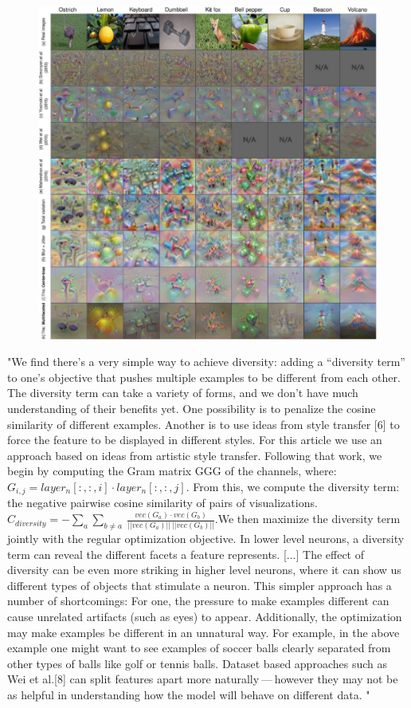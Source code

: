 \documentclass[]{scrartcl}
\begin{document}
\begin{figure}[h]
	\centering
	\includegraphics[width=1\linewidth]{multifaceted}
\end{figure}
"We ﬁnd there’s a very simple way to achieve diversity: adding a “diversity term” to one’s objective that pushes multiple examples to be different from each other. The diversity term can take a variety of forms, and we don’t have much understanding of their beneﬁts yet. One possibility is to penalize the cosine similarity of different examples. Another is to use ideas from style transfer [6] to force the feature to be displayed in different styles. For this article we use an approach based on ideas from artistic style transfer. Following that work, we begin by computing the Gram matrix GGG of the channels, where: $G_{i,j} = layer_n[:, :, i] \cdot layer_n[:, :, j]$. From this, we compute the diversity term: the negative pairwise cosine similarity of pairs of visualizations. $C_{diversity} = - \sum_{a} \sum_{b\neq a} ~ \frac{vec(G_a) \cdot vec(G_b)}{||vec(G_a)||~||vec(G_b)||}$.​ We then maximize the diversity term jointly with the regular optimization objective. In lower level neurons, a diversity term can reveal the different facets a feature represents. [...] The effect of diversity can be even more striking in higher level neurons, where it can show us different types of objects that stimulate a neuron. This simpler approach has a number of shortcomings: For one, the pressure to make examples different can cause unrelated artifacts (such as eyes) to appear. Additionally, the optimization may make examples be different in an unnatural way. For example, in the above example one might want to see examples of soccer balls clearly separated from other types of balls like golf or tennis balls. Dataset based approaches such as Wei et al.[8] can split features apart more naturally — however they may not be as helpful in understanding how the model will behave on different data. " \cite{Olah2017}
\end{document}
